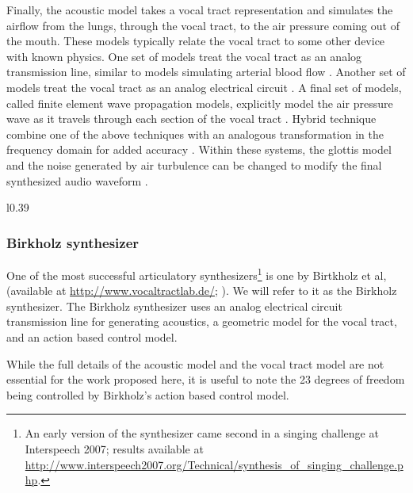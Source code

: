 \documentclass{article}
\begin{document}
Finally, the acoustic model takes
a vocal tract representation
and simulates the airflow from
the lungs, through the vocal tract,
to the air pressure coming out of the mouth.
These models typically relate
the vocal tract to some other
device with known physics.
One set of models treat the vocal tract
as an analog transmission line,
similar to models simulating
arterial blood flow \citep{XXX}.
Another set of models treat the vocal tract
as an analog electrical circuit
\citep{XXX}.
A final set of models,
called finite element wave propagation models,
explicitly model the air pressure wave
as it travels through each section
of the vocal tract \citep{XXX}.
Hybrid technique combine one
of the above techniques
with an analogous transformation
in the frequency domain for added accuracy
\citep{XXX}.
Within these systems, the glottis model
and the noise generated
by air turbulence can be changed
to modify the final synthesized audio waveform
\citep{XXX}.

\begin{wrapfigure}{l}{0.39\textwidth}
  \vspace{-30pt}
  \begin{center}
  \end{center}
  \vspace{-24pt}
\end{wrapfigure}

\subsubsection{Birkholz synthesizer}
\label{subsec:birkholz}

One of the most successful articulatory
synthesizers\footnote{An early version of the synthesizer
  came second in a singing challenge
  at Interspeech 2007; results available at
  \url{http://www.interspeech2007.org/Technical/synthesis_of_singing_challenge.php}.}
is one by Birtkholz et al,
(available at \url{http://www.vocaltractlab.de/};
\citealp{XXX}).
We will refer to it as the Birkholz synthesizer.
The Birkholz synthesizer uses
an analog electrical circuit transmission line
for generating acoustics,
a geometric model for the vocal tract,
and an action based control model.

While the full details of the acoustic model
and the vocal tract model are not
essential for the work proposed here,
it is useful to note
the 23 degrees of freedom
being controlled by Birkholz's
action based control model.
\end{document}
